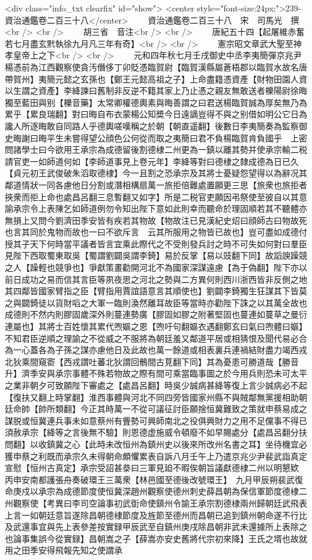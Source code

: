 <div class="info_txt clearfix" id="show">
<center style="font-size:24px;">239-資治通鑑卷二百三十八</center>
  　　資治通鑑卷二百三十八　宋　司馬光　撰<br />
<br />
　　胡三省　音注<br />
<br />
　　唐紀五十四【起屠維赤奮若七月盡玄黓執徐九月凡三年有奇】<br />
<br />
　　憲宗昭文章武大聖至神孝皇帝上之下<br />
<br />
　　元和四年秋七月壬戌御史中丞李夷簡彈京兆尹楊憑前為江西觀察使貪汚僭侈丁卯貶憑臨賀尉【臨賀漢縣屬蒼梧郡以臨賀水故名唐帶賀州】夷簡元懿之玄孫也【鄭王元懿高祖之子】上命盡籍憑資產【財物田園人資以生謂之資產】李絳諫曰舊制非反逆不籍其家上乃止憑之親友無敢送者櫟陽尉徐晦獨至藍田與别【櫟音藥】太常卿權德輿素與晦善謂之曰君送楊臨賀誠為厚矣無乃為累乎【累良瑞翻】對曰晦自布衣蒙楊公知奬今日遠謫豈得不與之别借如明公它日為讒人所逐晦敢自同路人乎德輿嗟嘆稱之於朝【朝直遥翻】後數日李夷簡奏為監察御史晦謝曰晦平生未嘗得望公顔色公何從而取之夷簡曰君不負楊臨賀肯負國乎　上密問諸學士曰今欲用王承宗為成德留後割德棣二州更為一鎮以離其勢并使承宗輸二税請官吏一如師道何如【李師道事見上卷元年】李絳等對曰德棣之隸成德為日已久【貞元初王武俊破朱滔取德棣】今一且割之恐承宗及其將士憂疑怨望得以為辭况其鄰道情狀一同各慮他日分割或潛相構扇萬一旅拒倍難處置願更三思【旅衆也旅拒者挾衆而拒上命也處昌呂翻三息暫翻又如字】所是二税官吏願因弔祭使至彼自以其意諭承宗令上表陳乞如師道例勿令知出陛下意如此則幸而聽命於理固順若其不聽體亦無損上又問今劉濟田季安皆有疾若其物故【物故注已見漢紀史炤曰顔師古曰物故死也言其同於鬼物而故也一曰不欲斥言　云其所服用之物皆已故也】豈可盡如成德付授其子天下何時當平議者皆言宜乘此際代之不受則發兵討之時不可失如何對曰羣臣見陛下西取蜀東取吳【蜀謂劉闢吳謂李錡】易於反掌【易以豉翻下同】故謟諛躁競之人【躁輕也競爭也】爭獻策畫勸開河北不為國家深謀遠慮【為于偽翻】陛下亦以前日成功之易而信其言臣等夙夜思之河北之勢與二方異何則西川浙西皆非反側之地其四鄰皆國家臂指之臣【臂指用賈誼語意言其順使也】劉闢李錡獨生狂謀其下皆莫之與闢錡徒以貨財㗖之大軍一臨則渙然離耳故臣等當時亦勸陛下誅之以其萬全故也成德則不然内則膠固歲深外則蔓連勢廣【膠固如膠之附著堅固也蔓連如蔓草之曼衍連屬也】其將士百姓懷其累代喣嫗之恩【喣吁句翻嫗衣遇翻鄭玄曰氣曰喣體曰嫗】不知君臣逆順之理諭之不從威之不服將為朝廷羞又鄰道平居或相猜恨及聞代易必合為一心蓋各為子孫之謀亦慮他日及此故也萬一餘道或相表裏兵連禍結財盡力竭西戎北狄乘間窺窬【西戎謂吐蕃北狄謂回鶻間古莧翻下同】其為憂患可勝道哉【勝音升】濟季安與承宗事體不殊若物故之際有間可乘當臨事圖之於今用兵則恐未可太平之業非朝夕可致願陛下審處之【處昌呂翻】時吳少誠病甚絳等復上言少誠病必不起【復扶又翻上時掌翻】淮西事體與河北不同四旁皆國家州縣不與賊鄰無黨援相助朝廷命帥【帥所類翻】今正其時萬一不從可議征討臣願捨恒冀難致之策就申蔡易成之謀脱或恒冀連兵事未如意蔡州有舋勢可興師南北之役俱興財力之用不足儻事不得已須赦承宗【絳等之言後無不驗】則恩德虚施威令頓廢不如早賜處分【處昌呂翻分扶問翻】以收鎮冀之心【此時未改恒州為鎮州史以後來所改州名書之耳】坐待機宜必獲申蔡之利既而承宗久未得朝命頗懼累表自訴八月壬午上乃遣京兆少尹裴武詣真定宣慰【恒州古真定】承宗受詔甚㳟曰三軍見廹不暇俟朝旨議獻德棣二州以明懇欵　丙申安南都護張舟奏破環王三萬衆【林邑國至德後改號環王】　九月甲辰朔裴武復命庚戍以承宗為成德節度使恒冀深趙州觀察使德州刺史薛昌朝為保信軍節度德棣二州觀察使【考異曰李司空論事初武衘命使鎮州令諭王承宗割德棣兩州歸朝廷武飛表上言一如朝廷意旨遂除昌朝德棣節度及旌節至德州而昌朝已追到鎮州朝命遂不行比及武還事宜與先上表參差按實録甲辰武至自鎮州庚戌除昌朝非武未還據所上表除之也論事集誤今從實録】昌朝嵩之子【薛嵩亦安史舊將代宗初來降】王氏之壻也故就用之田季安得飛報先知之使謂承